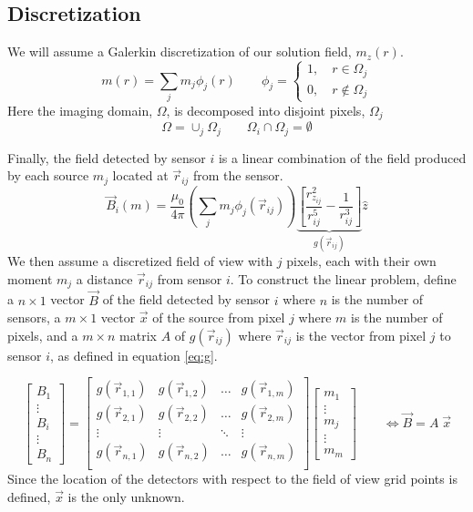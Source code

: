 \documentclass[a4paper]{article}
\begin{document}
\subsection{Discretization}

We will assume a Galerkin discretization of our solution field, $m_z(r)$.
\[
  m(r) = \sum_j m_j \phi_j  (r)
   \qquad 
  \phi_j = 
   \left\{ \begin{split}
     1, \quad r \in    \Omega_j \\
     0, \quad r \notin \Omega_j
   \end{split}
   \right.
\]
Here the imaging domain, $\Omega$, is decomposed into disjoint pixels,
$\Omega_j$
\[
   \Omega = \cup_j \Omega_j
  \qquad
   \Omega_i  \cap \Omega_j = \emptyset
\]


Finally, the field detected by sensor $i$ is a linear combination of the
field produced by each source $m_j$ 
located at $\vec{r}_{ij}$ from
the sensor. 
 \[
\vec{B}_i(m)=\frac{\mu_{0}}{4\pi}
  \left(\sum_j m_j \phi_j  (\vec{r}_{ij})\right)
  \underbrace{
   \left[
       \frac{r_{z_{ij}}^{2}}{r^{5}_{ij}}-\frac{1}{r^{3}_{ij}}
   \right]
   }_{g(\vec{r}_{ij})}
 \hat{z}
\]
We then assume a discretized field of view with $j$ pixels, each with their own moment $m_{j}$ a distance $\vec{r}_{ij}$ from sensor $i$.  To construct the linear problem, define a $n\times1$ vector $\vec{B}$ of the field detected by sensor $i$ where $n$ is the number of sensors, a $m\times1$ vector $\vec{x}$ of the source from pixel $j$ where $m$ is the number of pixels, and a $m\times n$ matrix $A$ of $g(\vec{r}_{ij})$ where $\vec{r}_{ij}$ is the vector from pixel $j$ to sensor $i$, as defined in equation \ref{eq:g}.

\begin{equation}
\begin{bmatrix}
B_{1}\\  
\vdots\\ 
B_{i}\\
\vdots\\
B_{n}
\end{bmatrix}
=
\begin{bmatrix} \label{eq:fullMatrix}
g(\vec{r}_{1,1}) & g(\vec{r}_{1,2}) & \dots  & g(\vec{r}_{1,m}) \\
g(\vec{r}_{2,1}) & g(\vec{r}_{2,2}) & \dots & g(\vec{r}_{2,m})\\
\vdots & \vdots & \ddots & \vdots\\
g(\vec{r}_{n,1}) & g(\vec{r}_{n,2}) & \hdots & g(\vec{r}_{n,m})\\
\end{bmatrix} 
\begin{bmatrix}
m_{1} \\ \vdots \\ m_{j} \\ \vdots \\ m_{m}
\end{bmatrix}
\qquad
\Leftrightarrow
\vec{B} = A \; \vec{x}
\end{equation}
Since the location of the detectors with respect to the field of view grid points is defined, $\vec{x}$ is the only unknown.  
\end{document}
